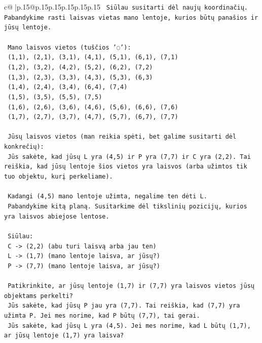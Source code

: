\documentclass{article}
\begin{document}
{\begin{supertabular}{c@{$\;$}|p{.15\linewidth}@{}p{.15\linewidth}p{.15\linewidth}p{.15\linewidth}p{.15\linewidth}p{.15\linewidth}}
{{{\texttt{   Siūlau susitarti dėl naujų koordinačių. Pabandykime rasti laisvas vietas mano lentoje, kurios būtų panašios ir jūsų lentoje.} \\
\\ 
\texttt{   Mano laisvos vietos (tuščios '◌'):} \\
\texttt{   (1,1), (2,1), (3,1), (4,1), (5,1), (6,1), (7,1)} \\
\texttt{   (1,2), (3,2), (4,2), (5,2), (6,2), (7,2)} \\
\texttt{   (1,3), (2,3), (3,3), (4,3), (5,3), (6,3)} \\
\texttt{   (1,4), (2,4), (3,4), (6,4), (7,4)} \\
\texttt{   (1,5), (3,5), (5,5), (7,5)} \\
\texttt{   (1,6), (2,6), (3,6), (4,6), (5,6), (6,6), (7,6)} \\
\texttt{   (1,7), (2,7), (3,7), (4,7), (5,7), (6,7), (7,7)} \\
\\ 
\texttt{   Jūsų laisvos vietos (man reikia spėti, bet galime susitarti dėl konkrečių):} \\
\texttt{   Jūs sakėte, kad jūsų L yra (4,5) ir P yra (7,7) ir C yra (2,2). Tai reiškia, kad jūsų lentoje šios vietos yra laisvos (arba užimtos tik tuo objektu, kurį perkeliame).} \\
\\ 
\texttt{   Kadangi (4,5) mano lentoje užimta, negalime ten dėti L.} \\
\texttt{   Pabandykime kitą planą. Susitarkime dėl tikslinių pozicijų, kurios yra laisvos abiejose lentose.} \\
\\ 
\texttt{   Siūlau:} \\
\texttt{   C {-}> (2,2) (abu turi laisvą arba jau ten)} \\
\texttt{   L {-}> (1,7) (mano lentoje laisva, ar jūsų?)} \\
\texttt{   P {-}> (7,7) (mano lentoje laisva, ar jūsų?)} \\
\\ 
\texttt{   Patikrinkite, ar jūsų lentoje (1,7) ir (7,7) yra laisvos vietos jūsų objektams perkelti?} \\
\texttt{   Jūs sakėte, kad jūsų P jau yra (7,7). Tai reiškia, kad (7,7) yra užimta P. Jei mes norime, kad P būtų (7,7), tai gerai.} \\
\texttt{   Jūs sakėte, kad jūsų L yra (4,5). Jei mes norime, kad L būtų (1,7), ar jūsų lentoje (1,7) yra laisva?} \\
}}}
\end{supertabular}}
\end{document}
